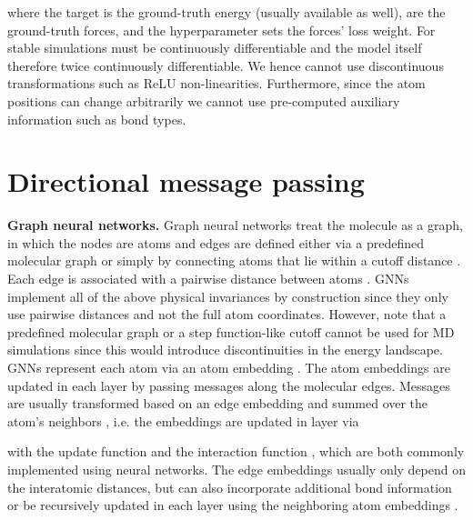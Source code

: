 \documentclass{article} \usepackage{iclr2020_conference,times}
\begin{document}
where the target  is the ground-truth energy (usually available as well),  are the ground-truth forces, and the hyperparameter  sets the forces' loss weight. For stable simulations  must be continuously differentiable and the model  itself therefore twice continuously differentiable. We hence cannot use discontinuous transformations such as ReLU non-linearities. Furthermore, since the atom positions  can change arbitrarily we cannot use pre-computed auxiliary information  such as bond types.

\section{Directional message passing} \label{sec:dime}

\textbf{Graph neural networks.} Graph neural networks treat the molecule as a graph, in which the nodes are atoms and edges are defined either via a predefined molecular graph or simply by connecting atoms that lie within a cutoff distance . Each edge is associated with a pairwise distance between atoms . GNNs implement all of the above physical invariances by construction since they only use pairwise distances and not the full atom coordinates. However, note that a predefined molecular graph or a step function-like cutoff cannot be used for MD simulations since this would introduce discontinuities in the energy landscape. GNNs represent each atom  via an atom embedding . The atom embeddings are updated in each layer by passing messages along the molecular edges. Messages are usually transformed based on an edge embedding  and summed over the atom's neighbors , i.e. the embeddings are updated in layer  via

with the update function  and the interaction function , which are both commonly implemented using neural networks. The edge embeddings  usually only depend on the interatomic distances, but can also incorporate additional bond information \citep{gilmer_neural_2017} or be recursively updated in each layer using the neighboring atom embeddings \citep{jorgensen_neural_2018}.
\end{document}
